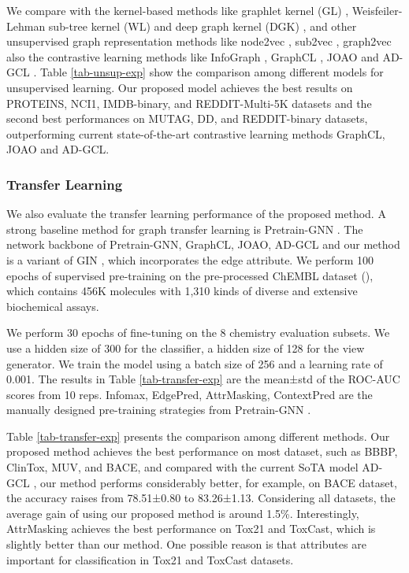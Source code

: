 We compare with the kernel-based methods like graphlet kernel (GL) , Weisfeiler-Lehman sub-tree kernel (WL)  and deep graph kernel (DGK) , and other unsupervised graph representation methods like node2vec \cite{grover2016node2vec}, sub2vec \cite{adhikari2018sub2vec}, graph2vec \cite{narayanan2017graph2vec} also the contrastive learning methods like InfoGraph \cite{sun2019infograph}, GraphCL \cite{you2020graphcl}, JOAO \cite{you2021joao} and AD-GCL \cite{suresh2021adgcl}. Table \ref{tab-unsup-exp} show the comparison among different models for unsupervised learning. Our proposed model achieves the best results on PROTEINS, NCI1, IMDB-binary, and REDDIT-Multi-5K datasets and the second best performances on MUTAG, DD, and REDDIT-binary datasets, outperforming current state-of-the-art contrastive learning methods GraphCL, JOAO and AD-GCL.

\subsubsection{Transfer Learning}

We also evaluate the transfer learning performance of the proposed method. A strong baseline method for graph transfer learning is Pretrain-GNN \cite{hu2019pretraingnn}. The network backbone of Pretrain-GNN, GraphCL, JOAO, AD-GCL and our method is a variant of GIN \cite{xu2018gin}, which incorporates the edge attribute. We perform 100 epochs of supervised pre-training on the pre-processed ChEMBL dataset (\cite{mayr2018chemdataset, gaulton2012chembl}), which contains 456K molecules with 1,310 kinds of diverse and extensive biochemical assays. 

We perform 30 epochs of fine-tuning on the 8 chemistry evaluation subsets. We use a hidden size of 300 for the classifier, a hidden size of 128 for the view generator. We train the model using a batch size of 256 and a learning rate of 0.001. The results in Table \ref{tab-transfer-exp} are the mean±std of the ROC-AUC scores from 10 reps. Infomax, EdgePred, AttrMasking, ContextPred are the manually designed pre-training strategies from Pretrain-GNN \cite{hu2019pretraingnn}. 

Table \ref{tab-transfer-exp} presents the comparison among different methods. Our proposed method achieves the best performance on most dataset, such as  BBBP, ClinTox, MUV, and BACE, and compared with the current SoTA model AD-GCL \cite{suresh2021adgcl}, our method performs considerably better, for example, on BACE dataset, the accuracy raises from 78.51±0.80 to 83.26±1.13. Considering all datasets, the average gain of using our proposed method is around 1.5\%. Interestingly, AttrMasking achieves the best performance on Tox21 and ToxCast, which is slightly better than our method. One possible reason is that attributes are important for classification in Tox21 and ToxCast datasets.

